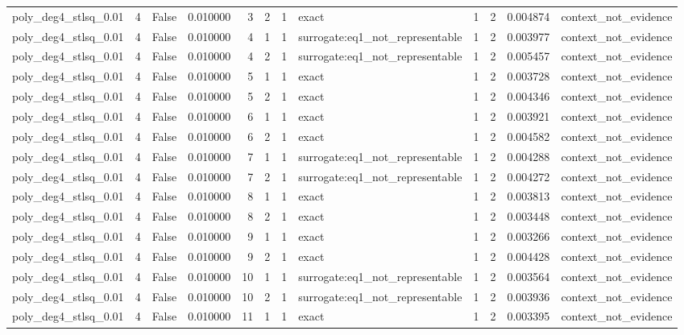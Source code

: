 \begin{tabular}{lrrrrrrlrrrl}
poly\_deg4\_stlsq\_0.01 & 4 & False & 0.010000 & 3 & 2 & 1 & exact & 1 & 2 & 0.004874 & context\_not\_evidence \\
poly\_deg4\_stlsq\_0.01 & 4 & False & 0.010000 & 4 & 1 & 1 & surrogate:eq1\_not\_representable & 1 & 2 & 0.003977 & context\_not\_evidence \\
poly\_deg4\_stlsq\_0.01 & 4 & False & 0.010000 & 4 & 2 & 1 & surrogate:eq1\_not\_representable & 1 & 2 & 0.005457 & context\_not\_evidence \\
poly\_deg4\_stlsq\_0.01 & 4 & False & 0.010000 & 5 & 1 & 1 & exact & 1 & 2 & 0.003728 & context\_not\_evidence \\
poly\_deg4\_stlsq\_0.01 & 4 & False & 0.010000 & 5 & 2 & 1 & exact & 1 & 2 & 0.004346 & context\_not\_evidence \\
poly\_deg4\_stlsq\_0.01 & 4 & False & 0.010000 & 6 & 1 & 1 & exact & 1 & 2 & 0.003921 & context\_not\_evidence \\
poly\_deg4\_stlsq\_0.01 & 4 & False & 0.010000 & 6 & 2 & 1 & exact & 1 & 2 & 0.004582 & context\_not\_evidence \\
poly\_deg4\_stlsq\_0.01 & 4 & False & 0.010000 & 7 & 1 & 1 & surrogate:eq1\_not\_representable & 1 & 2 & 0.004288 & context\_not\_evidence \\
poly\_deg4\_stlsq\_0.01 & 4 & False & 0.010000 & 7 & 2 & 1 & surrogate:eq1\_not\_representable & 1 & 2 & 0.004272 & context\_not\_evidence \\
poly\_deg4\_stlsq\_0.01 & 4 & False & 0.010000 & 8 & 1 & 1 & exact & 1 & 2 & 0.003813 & context\_not\_evidence \\
poly\_deg4\_stlsq\_0.01 & 4 & False & 0.010000 & 8 & 2 & 1 & exact & 1 & 2 & 0.003448 & context\_not\_evidence \\
poly\_deg4\_stlsq\_0.01 & 4 & False & 0.010000 & 9 & 1 & 1 & exact & 1 & 2 & 0.003266 & context\_not\_evidence \\
poly\_deg4\_stlsq\_0.01 & 4 & False & 0.010000 & 9 & 2 & 1 & exact & 1 & 2 & 0.004428 & context\_not\_evidence \\
poly\_deg4\_stlsq\_0.01 & 4 & False & 0.010000 & 10 & 1 & 1 & surrogate:eq1\_not\_representable & 1 & 2 & 0.003564 & context\_not\_evidence \\
poly\_deg4\_stlsq\_0.01 & 4 & False & 0.010000 & 10 & 2 & 1 & surrogate:eq1\_not\_representable & 1 & 2 & 0.003936 & context\_not\_evidence \\
poly\_deg4\_stlsq\_0.01 & 4 & False & 0.010000 & 11 & 1 & 1 & exact & 1 & 2 & 0.003395 & context\_not\_evidence \\

\end{tabular}
